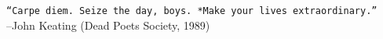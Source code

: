 
\thispagestyle{empty}
\strut 
\vfill
\begin{flushright}
\begin{minipage}[t]{.4\textwidth}
\hfill
\end{minipage}
\begin{minipage}[t]{.6\textwidth}
\begin{flushright}
	\texttt{``{\it Carpe diem.} Seize the day, boys. \\*Make your lives extraordinary.''} \\ --John Keating (Dead Poets Society, 1989) %
\end{flushright}
\end{minipage}    
\end{flushright}
\vfill 
\strut



